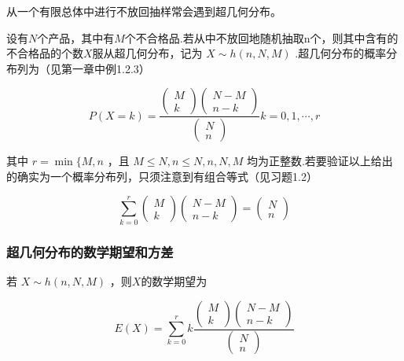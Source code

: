 从一个有限总体中进行不放回抽样常会遇到超几何分布。

设有$ N $个产品，其中有$ M $个不合格品.若从中不放回地随机抽取n个，则其中含有的不合格品的个数$ X $服从超几何分布，记为 $X \sim h(n, N, M)$ .超几何分布的概率分布列为（见第一章中例1.2.3）

\begin{equation}
P(X=k)=\frac{\left( \begin{array}{c}{M} \\ {k}\end{array}\right) \left( \begin{array}{c}{N-M} \\ {n-k}\end{array}\right)}{\left( \begin{array}{c}{N} \\ {n}\end{array}\right)} k=0,1, \cdots, r \label{eq:2.4.6}
\end{equation}

其中 $r=\min \{M, n$ ，且 $M \leqslant N, n \leqslant N, n, N, M$ 均为正整数.若要验证以上给出的确实为一个概率分布列，只须注意到有组合等式（见习题1.2）

\[
\sum_{k=0}^{r} \left( \begin{array}{c}{M} \\ {k}\end{array}\right) \left( \begin{array}{c}{N-M} \\ {n-k}\end{array}\right)=\left( \begin{array}{l}{N} \\ {n}\end{array}\right)
\]

\subsubsection{超几何分布的数学期望和方差}

若 $X \sim h(n, N, M)$ ，则$ X $的数学期望为

\[
E(X)=\sum_{k=0}^{r} k \frac{\left( 
	\begin{array}{c}
	{M} \\ 
	{k}
	\end{array}
	\right) 
	\left( 
	\begin{array}{c}
	{N-M} \\ 
	{n-k}
	\end{array}
	\right)}{\left( 
	\begin{array}{l}
	{N} \\ 
	{n}
	\end{array}
	\right)}
\]

